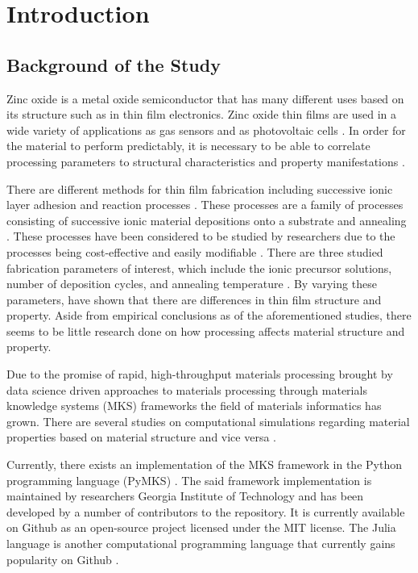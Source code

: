 \chapter{Introduction}
\section{Background of the Study}
Zinc oxide is a metal oxide semiconductor that has many different uses based on its structure such as in thin film electronics.
Zinc oxide thin films are used in a wide variety of applications as gas sensors \cite{florido17} and as photovoltaic cells \cite{fetsense}.
In order for the material to perform predictably, it is necessary to be able to correlate processing parameters to structural characteristics and property manifestations \cite{florido17, fetsense}.

There are different methods for thin film fabrication including successive ionic layer adhesion and reaction processes \cite{florido17}.
These processes are a family of processes consisting of successive ionic material depositions onto a substrate and annealing \cite{gao08}.
These processes have been considered to be studied by researchers due to the processes being cost-effective and easily modifiable \cite{gao08, vargas08, vargas2}.
There are three studied fabrication parameters of interest, which include the ionic precursor solutions, number of deposition cycles, and annealing temperature \cite{gao08,vargas08}.
By varying these parameters,  have shown that there are differences in thin film structure and property.
Aside from empirical conclusions as of the aforementioned studies, there seems to be little research done on how processing affects material structure and property.

Due to the promise of rapid, high-throughput materials processing brought by data science driven approaches to materials processing through materials knowledge systems (MKS) frameworks \cite{yabansu14, gupta15, sun17} the field of materials informatics has grown.
There are several studies on computational simulations regarding material properties based on material structure and vice versa \cite{yabansu14, gupta15}.

Currently, there exists an implementation of the MKS framework in the Python programming language (PyMKS) \cite{pymks}. The said framework implementation is maintained by researchers Georgia Institute of Technology and has been developed by a number of contributors to the repository.
It is currently available on Github as an open-source project licensed under the MIT license.
The Julia language is another computational programming language that currently gains popularity on Github \cite{julia15}.

